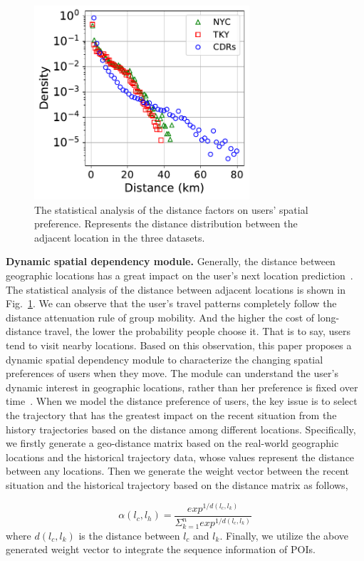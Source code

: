 \documentclass[10pt,journal,compsoc]{IEEEtran}
\begin{document}
\begin{figure}[htpb]
    \centering
    \includegraphics[width=8cm]{figure/distance.pdf}
    \caption{The statistical analysis of the distance factors on users’ spatial preference. Represents the distance distribution between the adjacent location in the three datasets.}
    \label{fig.5}
\end{figure}

\textbf{Dynamic spatial dependency module.} Generally, the distance between geographic locations has a great impact on the user's next location prediction~\cite{sun2020go}. The statistical analysis of the distance between adjacent locations is shown in Fig.~\ref{fig.5}. We can observe that the user's travel patterns completely follow the distance attenuation rule of group mobility. And the higher the cost of long-distance travel, the lower the probability people choose it. That is to say, users tend to visit nearby locations. Based on this observation, this paper proposes a dynamic spatial dependency module to characterize the changing spatial preferences of users when they move. The module can understand the user's dynamic interest in geographic locations, rather than her preference is fixed over time~\cite{zhang2019multi}. When we model the distance preference of users, the key issue is to select the trajectory that has the greatest impact on the recent situation from the history trajectories based on the distance among different locations. Specifically, we firstly generate a geo-distance matrix based on the real-world geographic locations and the historical trajectory data, whose values represent the distance between any locations. Then we generate the weight vector between the recent situation and the historical trajectory based on the distance matrix as follows,

\begin{equation}
    \alpha(l_c,l_h) = \frac{exp^{1/d(l_c,l_k)}}{\Sigma^{n}_{k=1}exp^{1/d(l_c,l_k)}}
\end{equation}
where $d(l_c,l_k)$ is the distance between $l_c$ and $l_k$. Finally, we utilize the above generated weight vector to integrate the sequence information of POIs.
\end{document}
